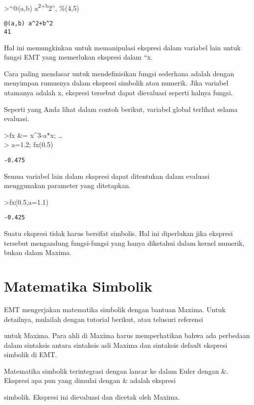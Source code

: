 \documentclass[
]{book}
\begin{document}
\textgreater{}``@(a,b) a\textsuperscript{2+b}2'', \%(4,5)

\begin{verbatim}
@(a,b) a^2+b^2
41
\end{verbatim}

Hal ini memungkinkan untuk memanipulasi ekspresi dalam variabel lain untuk fungsi EMT yang memerlukan ekspresi dalam ``x.

Cara paling mendasar untuk mendefinisikan fungsi sederhana adalah dengan menyimpan rumusnya dalam ekspresi simbolik atau numerik. Jika variabel utamanya adalah x, ekspresi tersebut dapat dievaluasi seperti halnya fungsi.

Seperti yang Anda lihat dalam contoh berikut, variabel global terlihat selama evaluasi.

\textgreater fx \&= x\^{}3-a*x; \ldots{}\\
\textgreater{} a=1.2; fx(0.5)

\begin{verbatim}
-0.475
\end{verbatim}

Semua variabel lain dalam ekspresi dapat ditentukan dalam evaluasi menggunakan parameter yang ditetapkan.

\textgreater fx(0.5,a=1.1)

\begin{verbatim}
-0.425
\end{verbatim}

Suatu ekspresi tidak harus bersifat simbolis. Hal ini diperlukan jika ekspresi tersebut mengandung fungsi-fungsi yang hanya diketahui dalam kernel numerik, bukan dalam Maxima.

\chapter{Matematika Simbolik}\label{matematika-simbolik}

EMT mengerjakan matematika simbolik dengan bantuan Maxima. Untuk detailnya, mulailah dengan tutorial berikut, atau telusuri referensi

untuk Maxima. Para ahli di Maxima harus memperhatikan bahwa ada perbedaan dalam sintaksis antara sintaksis asli Maxima dan sintaksis default ekspresi simbolik di EMT.

Matematika simbolik terintegrasi dengan lancar ke dalam Euler dengan \&. Ekspresi apa pun yang dimulai dengan \& adalah ekspresi

simbolik. Ekspresi ini dievaluasi dan dicetak oleh Maxima.
\end{document}
